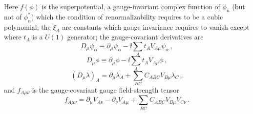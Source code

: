 Here \(f(\phi)\) is the superpotential, a gauge-invariant complex function of
\(\phi_n\) (but not of \(\phi_n^*\)) which the condition of renormalizability
requires to be a cubic polynomial; the \(\xi_A\) are constants which gauge
invariance requires to vanish except where \(t_A\) is a \(U(1)\) generator;
the gauge-covariant derivatives are
\begin{equation}
  D_\mu\psi_\alpha
  \equiv\partial_\mu\psi_\alpha-\ii\sum_A t_A V_{A\mu}\psi_\alpha\,,
  \tag{27.4.2}\label{eq:27.4.2}
\end{equation}
\begin{equation}
  D_\mu\phi
  \equiv\partial_\mu\phi-\ii\sum_A t_A V_{A\mu}\phi\,,
  \tag{27.4.3}\label{eq:27.4.3}
\end{equation}
\begin{equation}
  (D_\mu\lambda)_A
  =\partial_\mu\lambda_A+\sum_{BC}C_{ABC}V_{B\mu}\lambda_C\,,
  \tag{27.4.4}\label{eq:27.4.4}
\end{equation}
and \(f_{A\mu\nu}\) is the gauge-covariant gauge field-strength tensor
\begin{equation}
  f_{A\mu\nu}
  =\partial_\mu V_{A\nu}-\partial_\nu V_{A\mu}
  +\sum_{BC}C_{ABC}V_{B\mu}V_{C\nu}\,.
  \tag{27.4.5}\label{eq:27.4.5}
\end{equation}

